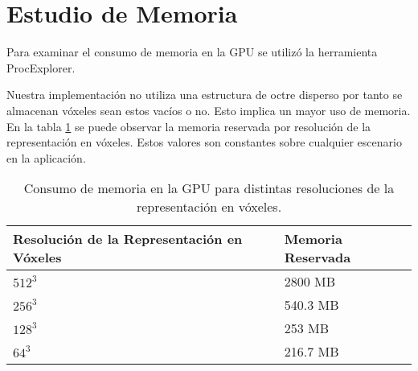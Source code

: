 \section{Estudio de Memoria}
Para examinar el consumo de memoria en la \ac{GPU} se utilizó la herramienta ProcExplorer.

Nuestra implementación no utiliza una estructura de octre disperso por tanto se almacenan vóxeles sean estos vacíos o no. Esto implica un mayor uso de memoria. En la tabla \ref{tab:memory} se puede observar la memoria reservada por resolución de la representación en vóxeles. Estos valores son constantes sobre cualquier escenario en la aplicación.

\begin{table}[h]
\centering
\begin{tabular}{ll}
Resolución de la Representación en Vóxeles & Memoria Reservada             \\ \hline
\multicolumn{1}{|l|}{$512^3$}                  & \multicolumn{1}{l|}{2800 MB}  \\
\multicolumn{1}{|l|}{$256^3$}                  & \multicolumn{1}{l|}{540.3 MB} \\
\multicolumn{1}{|l|}{$128^3$}                  & \multicolumn{1}{l|}{253 MB}   \\
\multicolumn{1}{|l|}{$64^3$}                   & \multicolumn{1}{l|}{216.7 MB} \\ \hline
\end{tabular}
\caption{Consumo de memoria en la \ac{GPU} para distintas resoluciones de la representación en vóxeles.}
\label{tab:memory}
\end{table}
